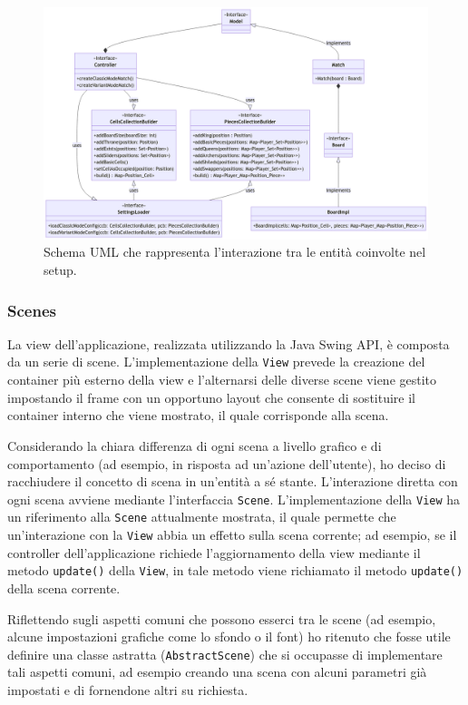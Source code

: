 \documentclass[a4paper,12pt]{report}
\begin{document}
\begin{figure}[H]
\centering
\includegraphics[width=\textwidth]{images/match-setup.png}
\caption{Schema UML che rappresenta l'interazione tra le entità coinvolte nel setup.}
\label{images:match-setup}
\end{figure}

\subsubsection{Scenes}

La view dell'applicazione, realizzata utilizzando la Java Swing API, è composta da un serie di scene.
L'implementazione della \texttt{View} prevede la creazione del container più esterno della view e l'alternarsi delle diverse scene viene gestito impostando il frame con un opportuno layout che consente di sostituire il container interno che viene mostrato, il quale corrisponde alla scena.

Considerando la chiara differenza di ogni scena a livello grafico e di comportamento (ad esempio, in risposta ad un'azione dell'utente), ho deciso di racchiudere il concetto di scena in un'entità a sé stante. L'interazione diretta con ogni scena avviene mediante l'interfaccia \texttt{Scene}. L'implementazione della \texttt{View} ha un riferimento alla \texttt{Scene} attualmente mostrata, il quale permette che un'interazione con la \texttt{View} abbia un effetto sulla scena corrente; ad esempio, se il controller dell'applicazione richiede l'aggiornamento della view mediante il metodo \texttt{update()} della \texttt{View}, in tale metodo viene richiamato il metodo \texttt{update()} della scena corrente.

Riflettendo sugli aspetti comuni che possono esserci tra le scene (ad esempio, alcune impostazioni grafiche come lo sfondo o il font) ho ritenuto che fosse utile definire una classe astratta (\texttt{AbstractScene}) che si occupasse di implementare tali aspetti comuni, ad esempio creando una scena con alcuni parametri già impostati e di fornendone altri su richiesta. 
\end{document}
